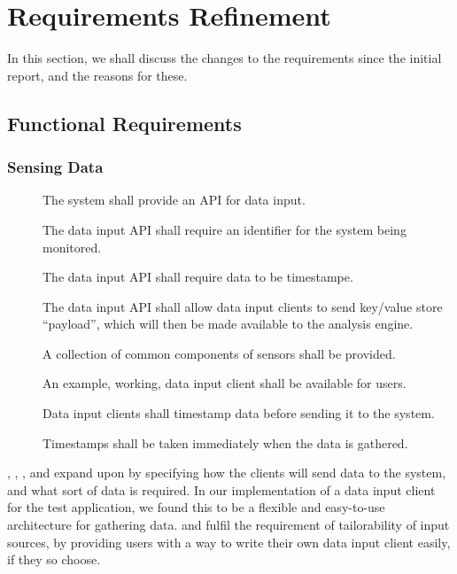\section{Requirements Refinement}
\label{sec:requirements}

In this section, we shall discuss the changes to the requirements
since the initial report, and the reasons for these.

\subsection{Functional Requirements}
\label{sec:requirements-functional}

\subsubsection{Sensing Data}
\label{sec:requirements-functional-sensing}
\begin{description}
  \item[] The system shall provide an API for data input.

  \item[] The data input API shall require an identifier for
  the system being monitored.

  \item[] The data input API shall require data to be
  timestampe.

  \item[] The data input API shall allow data input clients
  to send key/value store ``payload'', which will then be made
  available to the analysis engine.

  \item[] A collection of common components of sensors shall
  be provided.

  \item[] An example, working, data input client shall be
  available for users.

  \item[]Data input clients shall timestamp data before
  sending it to the system.

  \item[] Timestamps shall be taken immediately when the
  data is gathered.
\end{description}

, , , and  expand upon  by
specifying how the clients will send data to the system, and what sort
of data is required. In our implementation of a data input client for
the test application, we found this to be a flexible and easy-to-use
architecture for gathering data.  and  fulfil the
requirement of tailorability of input sources, by providing users with
a way to write their own data input client easily, if they so choose.

